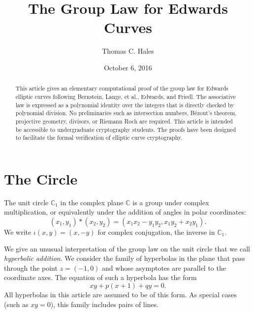 \documentclass[12pt]{article}
\title{The Group Law for Edwards Curves}
\author{Thomas C. Hales}
\date{October 6, 2016}
\newcommand{\ring}[1]{\mathbb{#1}}
\begin{document}
\maketitle

\begin{abstract} 
  This article gives an elementary computational proof of the group
  law for Edwards elliptic curves following  Bernstein, Lange, et al.,
  Edwards, and Friedl.  The associative law is expressed as a polynomial
  identity over the integers that is directly checked by polynomial division.
  No preliminaries such as intersection numbers, 
  B\'ezout's theorem, projective geometry, divisors,
  or Riemann Roch are required. This article is intended be accessible to
  undergraduate cryptography students.  The proofs have been designed
  to facilitate the formal verification of elliptic curve cryptography.
\end{abstract}

\baselineskip
{}\baselineskip

\newenvironment{blockquote}{%
  \par%
  \medskip%
  \baselineskip=0.7\baselineskip%
  \leftskip=2em\rightskip=2em%
  \noindent\ignorespaces}{%
  \par\medskip}


\section{The Circle}

The unit circle $\ring{C}_1$ in the complex plane $\ring{C}$ is a
group under complex multiplication, or equivalently under the addition
of angles in polar coordinates:  
\begin{equation}\label{eqn:cx}
(x_1,y_1) * (x_2,y_2) = (x_1 x_2 - y_1 y_2,x_1 y_2 + x_2 y_1).
\end{equation}
We write $\iota(x,y) = (x,-y)$ for
complex conjugation, the inverse in $\ring{C}_1$.

We give an unusual interpretation of the group law on the unit circle
that we call {\it hyperbolic addition}.  We consider the family of
hyperbolas in the plane that pass through the point $z=(-1,0)$ and
whose asymptotes are parallel to the coordinate axes.  The equation of
such a hyperbola has the form
\begin{equation}\label{eqn:hyp}
x y + p (x+1) + q y = 0.
\end{equation}
All hyperbolas in this article are assumed to be of this form.  As
special cases (such as $x y=0$), this family includes pairs of lines.
 
\end{document}
